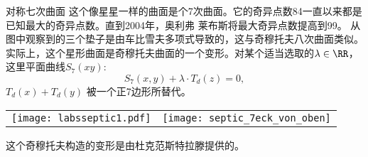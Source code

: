 ﻿\begin{surferPage}[七次曲面]{对称七次曲面}
这个像星星一样的曲面是个7次曲面。它的奇异点数84一直以来都是已知最大的奇异点数。直到2004年，奥利弗 莱布斯将最大奇异点数提高到99。
从图中观察到的三个垫子是由车比雪夫多项式导致的，这与奇穆托夫八次曲面类似。实际上，这个星形曲面是奇穆托夫曲面的一个变形。对某个适当选取的$\lambda\in\RR$，这里平面曲线$S_7(xy)$: \[S_7(x,y) + \lambda \cdot T_d(z) = 0,\] $T_d(x)+T_d(y)$ 被一个正7边形所替代。
\vspace*{-0.3em}
    \begin{center}
      \begin{tabular}{c@{\qquad}c}
        \texttt{[image: labsseptic1.pdf]}
        &
        \texttt{[image: septic\_7eck\_von\_oben]}
      \end{tabular}
    \end{center}
    \vspace*{-0.3em}
这个奇穆托夫构造的变形是由杜克范斯特拉滕提供的。
\end{surferPage}

